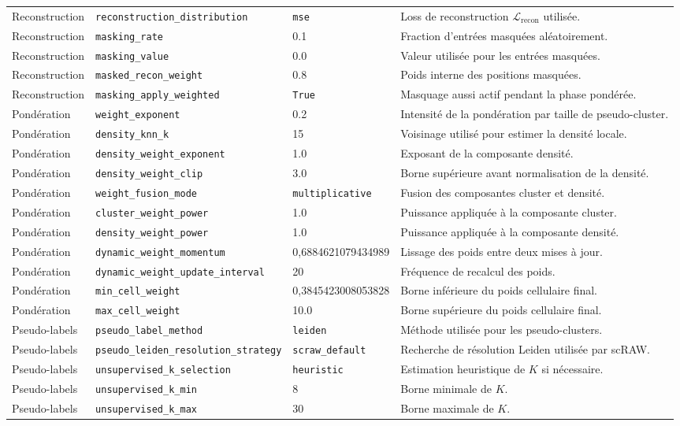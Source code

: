 {\begin{longtable}{p{}p{}p{}p{}}
Reconstruction & \texttt{reconstruction\_distribution} & \texttt{mse} & Loss de reconstruction \(\mathcal{L}_{\mathrm{recon}}\) utilisée. \\
Reconstruction & \texttt{masking\_rate} & 0.1 & Fraction d'entrées masquées aléatoirement. \\
Reconstruction & \texttt{masking\_value} & 0.0 & Valeur utilisée pour les entrées masquées. \\
Reconstruction & \texttt{masked\_recon\_weight} & 0.8 & Poids interne des positions masquées. \\
Reconstruction & \texttt{masking\_apply\_weighted} & \texttt{True} & Masquage aussi actif pendant la phase pondérée. \\

Pondération & \texttt{weight\_exponent} & 0.2 & Intensité de la pondération par taille de pseudo-cluster. \\
Pondération & \texttt{density\_knn\_k} & 15 & Voisinage utilisé pour estimer la densité locale. \\
Pondération & \texttt{density\_weight\_exponent} & 1.0 & Exposant de la composante densité. \\
Pondération & \texttt{density\_weight\_clip} & 3.0 & Borne supérieure avant normalisation de la densité. \\
Pondération & \texttt{weight\_fusion\_mode} & \texttt{multiplicative} & Fusion des composantes cluster et densité. \\
Pondération & \texttt{cluster\_weight\_power} & 1.0 & Puissance appliquée à la composante cluster. \\
Pondération & \texttt{density\_weight\_power} & 1.0 & Puissance appliquée à la composante densité. \\
Pondération & \texttt{dynamic\_weight\_momentum} & 0,688462\allowbreak{}1079434989 & Lissage des poids entre deux mises à jour. \\
Pondération & \texttt{dynamic\_weight\_update\_interval} & 20 & Fréquence de recalcul des poids. \\
Pondération & \texttt{min\_cell\_weight} & 0,384542\allowbreak{}3008053828 & Borne inférieure du poids cellulaire final. \\
Pondération & \texttt{max\_cell\_weight} & 10.0 & Borne supérieure du poids cellulaire final. \\

Pseudo-labels & \texttt{pseudo\_label\_method} & \texttt{leiden} & Méthode utilisée pour les pseudo-clusters. \\
Pseudo-labels & \texttt{pseudo\_leiden\_resolution\_strategy} & \texttt{scraw\_default} & Recherche de résolution Leiden utilisée par scRAW. \\
Pseudo-labels & \texttt{unsupervised\_k\_selection} & \texttt{heuristic} & Estimation heuristique de \(K\) si nécessaire. \\
Pseudo-labels & \texttt{unsupervised\_k\_min} & 8 & Borne minimale de \(K\). \\
Pseudo-labels & \texttt{unsupervised\_k\_max} & 30 & Borne maximale de \(K\). \\


\end{longtable}}
